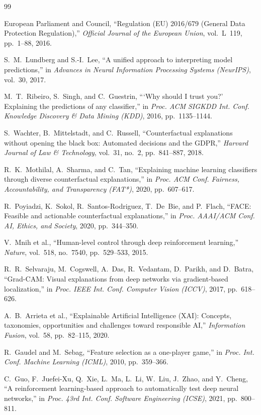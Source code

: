 \documentclass[conference]{IEEEtran}
\begin{document}
\begin{thebibliography}{99}

European Parliament and Council, ``Regulation (EU) 2016/679 (General Data
Protection Regulation),'' \emph{Official Journal of the European Union},
vol.~L~119, pp.~1--88, 2016.

S.~M.~Lundberg and S.-I.~Lee, ``A unified approach to interpreting model
predictions,'' in \emph{Advances in Neural Information Processing Systems
(NeurIPS)}, vol.~30, 2017.

M.~T.~Ribeiro, S.~Singh, and C.~Guestrin, ```Why should I trust you?'
Explaining the predictions of any classifier,'' in \emph{Proc. ACM SIGKDD
Int. Conf. Knowledge Discovery \& Data Mining (KDD)}, 2016,
pp.~1135--1144.

S.~Wachter, B.~Mittelstadt, and C.~Russell, ``Counterfactual explanations
without opening the black box: Automated decisions and the GDPR,''
\emph{Harvard Journal of Law \& Technology}, vol.~31, no.~2, pp.~841--887,
2018.

R.~K.~Mothilal, A.~Sharma, and C.~Tan, ``Explaining machine learning
classifiers through diverse counterfactual explanations,'' in \emph{Proc.
ACM Conf. Fairness, Accountability, and Transparency (FAT*)}, 2020,
pp.~607--617.

R.~Poyiadzi, K.~Sokol, R.~Santos-Rodriguez, T.~De~Bie, and P.~Flach,
``FACE: Feasible and actionable counterfactual explanations,'' in \emph{Proc.
AAAI/ACM Conf. AI, Ethics, and Society}, 2020, pp.~344--350.

V.~Mnih et al., ``Human-level control through deep reinforcement learning,''
\emph{Nature}, vol.~518, no.~7540, pp.~529--533, 2015.

R.~R.~Selvaraju, M.~Cogswell, A.~Das, R.~Vedantam, D.~Parikh, and
D.~Batra, ``Grad-CAM: Visual explanations from deep networks via
gradient-based localization,'' in \emph{Proc. IEEE Int. Conf. Computer
Vision (ICCV)}, 2017, pp.~618--626.

A.~B.~Arrieta et al., ``Explainable Artificial Intelligence (XAI):
Concepts, taxonomies, opportunities and challenges toward responsible AI,''
\emph{Information Fusion}, vol.~58, pp.~82--115, 2020.

R.~Gaudel and M.~Sebag, ``Feature selection as a one-player game,'' in
\emph{Proc. Int. Conf. Machine Learning (ICML)}, 2010, pp.~359--366.

C.~Guo, F.~Juefei-Xu, Q.~Xie, L.~Ma, L.~Li, W.~Liu, J.~Zhao, and
Y.~Cheng, ``A reinforcement learning-based approach to automatically test
deep neural networks,'' in \emph{Proc. 43rd Int. Conf. Software Engineering
(ICSE)}, 2021, pp.~800--811.

\end{thebibliography}
\end{document}

